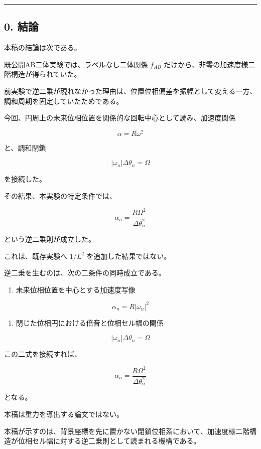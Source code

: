 \documentclass[
  a4paper,
]{ltjsarticle}
\providecommand{\tightlist}{%
  \setlength{\itemsep}{0pt}\setlength{\parskip}{0pt}}
\begin{document}
\begin{center}\rule{0.5\linewidth}{0.5pt}\end{center}

\subsection{0. 結論}\label{ux7d50ux8ad6}

本稿の結論は次である。

既公開AB二体実験では、ラベルなし二体関係 \(f_{AB}\)
だけから、非零の加速度様二階構造が得られていた。

前実験で逆二乗が現れなかった理由は、位置位相偏差を振幅として変える一方、調和周期を固定していたためである。

今回、円周上の未来位相位置を関係的な回転中心として読み、加速度関係

\[
\alpha=R\omega^2
\]

と、調和閉鎖

\[
|\omega_n|\Delta\theta_n=\Omega
\]

を接続した。

その結果、本実験の特定条件では、

\[
\alpha_n
=\frac{R\Omega^2}{\Delta\theta_n^2}
\]

という逆二乗則が成立した。

これは、既存実験へ \(1/L^2\) を追加した結果ではない。

逆二乗を生むのは、次の二条件の同時成立である。

\begin{enumerate}
\def\labelenumi{\arabic{enumi}.}
\tightlist
\item
  未来位相位置を中心とする加速度写像
\end{enumerate}

\[
\alpha_n=R|\omega_n|^2
\]

\begin{enumerate}
\def\labelenumi{\arabic{enumi}.}
\setcounter{enumi}{1}
\tightlist
\item
  閉じた位相円における倍音と位相セル幅の関係
\end{enumerate}

\[
|\omega_n|\Delta\theta_n=\Omega
\]

この二式を接続すれば、

\[
\boxed{
\alpha_n
=\frac{R\Omega^2}{\Delta\theta_n^2}
}
\]

となる。

本稿は重力を導出する論文ではない。

本稿が示すのは、背景座標を先に置かない閉鎖位相系において、加速度様二階構造が位相セル幅に対する逆二乗則として読まれる機構である。
\end{document}
